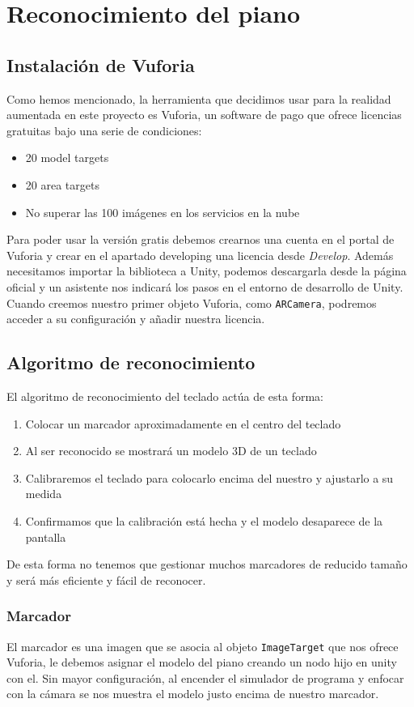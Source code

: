 \section{Reconocimiento del piano}
\subsection{Instalación de Vuforia}\label{vuforia}
Como hemos mencionado, la herramienta que decidimos usar para la realidad aumentada
en este proyecto es Vuforia, un software de pago que ofrece licencias gratuitas bajo
una serie de condiciones:
\begin{itemize}
	\item 20 model targets
	\item 20 area targets
	\item No superar las 100 imágenes en los servicios en la nube
\end{itemize}

Para poder usar la versión gratis debemos crearnos una cuenta en el portal de Vuforia
y crear en el apartado developing una licencia desde \textit{Develop}. Además
necesitamos importar la biblioteca a Unity, podemos descargarla desde la página oficial
y un asistente nos indicará los pasos en el entorno de desarrollo de Unity.
Cuando creemos nuestro primer objeto Vuforia, como \texttt{ARCamera}, podremos
acceder a su configuración y añadir nuestra licencia. 

\subsection{Algoritmo de reconocimiento}
El algoritmo de reconocimiento del teclado actúa de esta forma:
\begin{enumerate}
	\item Colocar un marcador aproximadamente en el centro del teclado
	\item Al ser reconocido se mostrará un modelo 3D de un teclado
	\item Calibraremos el teclado para colocarlo encima del nuestro y ajustarlo a su medida
	\item Confirmamos que la calibración está hecha y el modelo desaparece de la pantalla
\end{enumerate}
De esta forma no tenemos que gestionar muchos marcadores de reducido tamaño y será más
 eficiente y fácil de reconocer.

\subsubsection{Marcador}
El marcador es una imagen que se asocia al objeto \texttt{ImageTarget} que nos ofrece Vuforia,
le debemos asignar el modelo del piano creando un nodo hijo en unity con el. Sin mayor configuración,
al encender el simulador de programa y enfocar con la cámara se nos muestra el modelo
justo encima de nuestro marcador.


